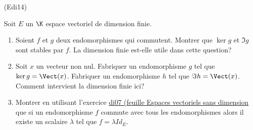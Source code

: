 \begin{tiny}(Edi14)\end{tiny}
Soit $E$ un $\K$ espace vectoriel de dimension finie.
\begin{enumerate}
 \item Soient $f$ et $g$ deux endomorphismes qui commutent. Montrer que $\ker g$ et $\Im g$ sont stables par $f$. La dimension finie est-elle utile dans cette question?
\item Soit $x$ un vecteur non nul. Fabriquer un endomorphisme $g$ tel que $\ker g=\Vect(x)$. Fabriquer un endomorphisme $h$ tel que $\Im h=\Vect(x)$. Comment intervient la dimension finie ici?
\item Montrer en utilisant l'exercice \href{\exosurl _fex_ev.pdf}{di07 (feuille Espaces vectoriels sans dimension} que si un endomorphisme $f$ commute avec tous les endomorphismes alors il existe un scalaire $\lambda$ tel que $f=\lambda Id_E$.
\end{enumerate}
